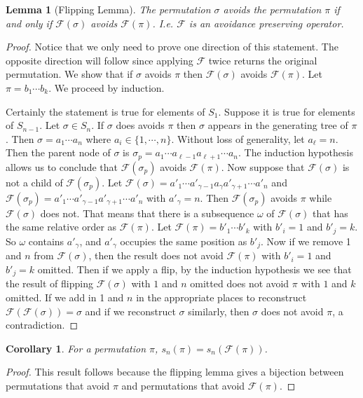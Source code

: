 \documentclass[11pt,letterpaper,twoside,english]{article}
\theoremstyle{theorem}
\newtheorem{corollary}[theorem]{Corollary}
\newtheorem{lemma}[theorem]{Lemma}
\theoremstyle{remark}
\begin{document}
\begin{lemma}[Flipping Lemma]
The permutation $\sigma$ avoids the permutation $\pi$ if and only if $\mathcal{F}(\sigma)$ avoids $\mathcal{F}(\pi)$. I.e. $\mathcal{F}$ is an avoidance preserving operator. 
\end{lemma}
\begin{proof}
Notice that we only need to prove one direction of this statement. The opposite direction will follow since applying $\mathcal{F}$ twice returns the original permutation. We show that if ${\sigma}$ avoids $\pi$ then $\mathcal{F}(\sigma)$ avoids $\mathcal{F}(\pi)$. Let $\pi=b_1\cdots b_k$. We proceed by induction.



Certainly the statement is true for elements of $S_1$. Suppose it is true for elements of $S_{n-1}$. Let $\sigma\in S_n$. If ${\sigma}$ does avoids $\pi$ then $\sigma$ appears in the generating tree of $\pi$.  Then $\sigma=a_1\cdots a_n$ where $a_i\in\{1,\cdots, n\}$. Without loss of generality, let $a_\ell=n$. Then the parent node of $\sigma$ is $\sigma_p=a_1\cdots a_{\ell-1} a_{\ell+1}\cdots a_n$. The induction hypothesis allows us to conclude that $\mathcal{F}(\sigma_p)$ avoids $\mathcal{F}(\pi)$. Now suppose that $\mathcal{F}(\sigma)$ is not a child of $\mathcal{F}(\sigma_p)$. Let $\mathcal{F}(\sigma)=a'_1\cdots a'_{\gamma-1} a_{\gamma}a'_{\gamma+1}\cdots a'_n$ and $\mathcal{F}(\sigma_p)=a'_1\cdots a'_{\gamma-1} a'_{\gamma+1}\cdots a'_n$ with $a'_\gamma=n$. Then $\mathcal{F}(\sigma_p)$ avoids $\pi$ while $\mathcal{F}(\sigma)$ does not. That means that there is a subsequence $\omega$ of $\mathcal{F}(\sigma)$ that has the same relative order as $\mathcal{F}(\pi)$. Let $\mathcal{F}(\pi)= b'_1\cdots b'_k$ with $b'_i=1$ and $b'_j=k$. So $\omega$ contains $a'_\gamma$, and $a'_\gamma$ occupies the same position as $b'_j$. Now if we remove 1 and $n$ from $\mathcal{F}(\sigma)$, then the result does not avoid $\mathcal{F}(\pi)$ with $b'_i=1$ and $b'_j=k$ omitted. Then if we apply a flip, by the induction hypothesis we see that the result of flipping $\mathcal{F}(\sigma)$ with $1$ and $n$ omitted does not avoid $\pi$ with $1$ and $k$ omitted. If we add in 1 and $n$ in the appropriate places to reconstruct $\mathcal{F}(\mathcal{F}(\sigma))=\sigma$ and if we reconstruct $\sigma$ similarly, then $\sigma$ does not avoid $\pi$, a contradiction. 
\end{proof}

\begin{corollary} 
For a permutation $\pi$, $s_n(\pi)=s_n(\mathcal{F}(\pi))$. 
\end{corollary}
\begin{proof}
This result follows because the flipping lemma gives a bijection between permutations that avoid $\pi$ and permutations that avoid $\mathcal{F}(\pi)$. 
\end{proof}
\end{document}
